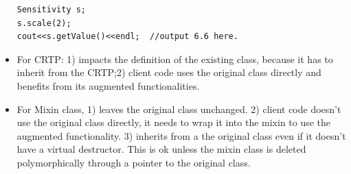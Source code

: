 \documentclass[a4paper,11pt,twoside]{book}
\begin{document}
\begin{itemize}
\begin{lstlisting}
Sensitivity s;
s.scale(2);
cout<<s.getValue()<<endl;  //output 6.6 here. 
\end{lstlisting}

\item For CRTP: 1) impacts the definition of the existing class, because it has to inherit from the CRTP;2) client code uses the original class directly and benefits from its augmented functionalities.

\item For Mixin class, 1) leaves the original class unchanged. 2) client code doesn’t use the original class directly, it needs to wrap it into the mixin to use the augmented functionality. 3) inherits from a the original class even if it doesn’t have a virtual destructor. This is ok unless the mixin class is deleted polymorphically through a pointer to the original class.

\end{itemize}
\end{document}
